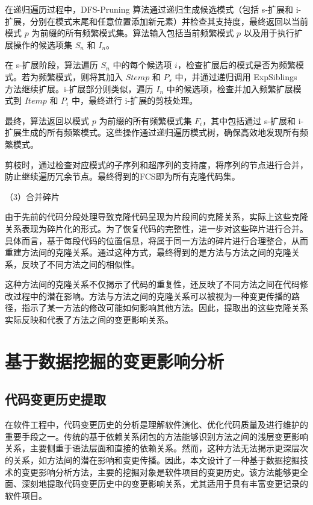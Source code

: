 在递归遍历过程中，DFS-Pruning 算法通过递归生成候选模式（包括 s-扩展和 i-扩展，分别在模式末尾和任意位置添加新元素）并检查其支持度，最终返回以当前模式 $p$ 为前缀的所有频繁模式集。算法输入包括当前频繁模式 $p$ 以及用于执行扩展操作的候选项集 $S_n$ 和 $I_n$。

在 s-扩展阶段，算法遍历 $S_n$ 中的每个候选项 $i$，检查扩展后的模式是否为频繁模式。若为频繁模式，则将其加入 $Stemp$ 和 $P_s$ 中，并通过递归调用 ExpSiblings 方法继续扩展。i-扩展部分则类似，遍历 $I_n$ 中的候选项，检查并加入频繁扩展模式到 $Itemp$ 和 $P_i$ 中，最终进行 i-扩展的剪枝处理。

最终，算法返回以模式 $p$ 为前缀的所有频繁模式集 $F_i$，其中包括通过 s-扩展和 i-扩展生成的所有频繁模式。这些操作通过递归遍历模式树，确保高效地发现所有频繁模式。


剪枝时，通过检查对应模式的子序列和超序列的支持度，将序列的节点进行合并，防止继续遍历冗余节点。最终得到的FCS即为所有克隆代码集。

（3）合并碎片

由于先前的代码分段处理导致克隆代码呈现为片段间的克隆关系，实际上这些克隆关系表现为碎片化的形式。为了恢复代码的完整性，进一步对这些碎片进行合并。具体而言，基于每段代码的位置信息，将属于同一方法的碎片进行合理整合，从而重建方法间的克隆关系。通过这种方式，最终得到的是方法与方法之间的克隆关系，反映了不同方法之间的相似性。

这种方法间的克隆关系不仅揭示了代码的重复性，还反映了不同方法之间在代码修改过程中的潜在影响。方法与方法之间的克隆关系可以被视为一种变更传播的路径，指示了某一方法的修改可能如何影响其他方法。因此，提取出的这些克隆关系实际反映和代表了方法之间的变更影响关系。

\section{基于数据挖掘的变更影响分析}
\subsection{代码变更历史提取}

在软件工程中，代码变更历史的分析是理解软件演化、优化代码质量及进行维护的重要手段之一。传统的基于依赖关系闭包的方法能够识别方法之间的浅层变更影响关系，主要侧重于语法层面和直接的依赖关系。然而，这种方法无法揭示更深层次的关系，如方法间的潜在影响和变更传播。因此，本文设计了一种基于数据挖掘技术的变更影响分析方法，主要的挖掘对象是软件项目的变更历史。该方法能够更全面、深刻地提取代码变更历史中的变更影响关系，尤其适用于具有丰富变更记录的软件项目。

